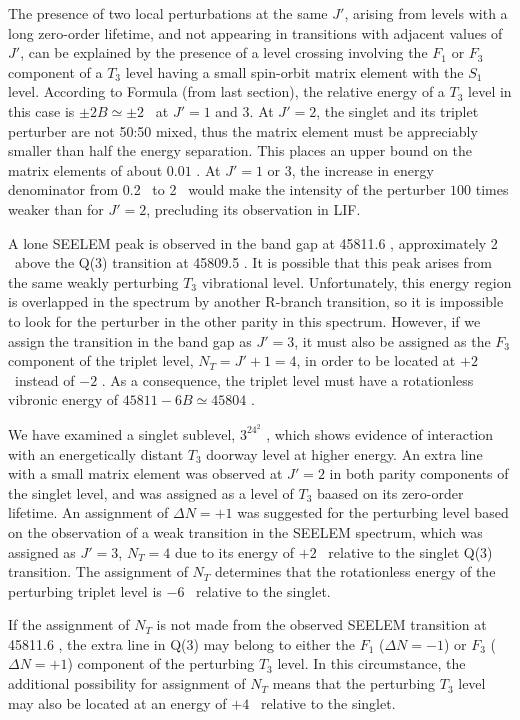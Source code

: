 \documentclass[12pt]{mitthesis}
\begin{document}
The presence of two local perturbations at the same $J'$, arising from
levels with a long zero-order lifetime, and not appearing in
transitions with adjacent values of $J'$, can be explained by the
presence of a level crossing involving the $F_1$ or $F_3$ component of
a $T_3$ level having a small spin-orbit matrix element with the $S_1$
level.  According to Formula (from last section), the relative energy
of a $T_3$ level in this case is $\pm 2B \simeq \pm 2$ \rcm\ at $J'=1$
and $3$.  At $J'=2$, the singlet and its triplet perturber are not
50:50 mixed, thus the matrix element must be appreciably smaller than
half the energy separation.  This places an upper bound on the matrix
elements of about $0.01$ \rcm.  At $J'=1$ or $3$, the increase in
energy denominator from 0.2 \rcm\ to 2 \rcm\ would make the intensity
of the perturber $100$ times weaker than for $J'=2$, precluding its
observation in LIF.

A lone SEELEM peak is observed in the band gap at 45811.6 \rcm,
approximately 2 \rcm\ above the Q(3) transition at 45809.5 \rcm.  It
is possible that this peak arises from the same weakly perturbing
$T_3$ vibrational level.  Unfortunately, this energy region is
overlapped in the spectrum by another R-branch transition, so it is
impossible to look for the perturber in the other parity in this
spectrum.  However, if we assign the transition in the band gap as
$J'=3$, it must also be assigned as the $F_3$ component of the triplet
level, $N_T=J'+1=4$, in order to be located at $+2$ \rcm\ instead of
$-2$ \rcm.  As a consequence, the triplet level must have a
rotationless vibronic energy of $45811 - 6B \simeq 45804$ \rcm.

We have examined a singlet sublevel, $3^24^2$ , which shows
evidence of interaction with an energetically distant $T_3$ doorway
level at higher energy.  An extra line with a small matrix element was
observed at $J'=2$ in both parity components of the singlet level, and
was assigned as a level of $T_3$ baased on its zero-order lifetime.
An assignment of $\Delta N=+1$ was suggested for the perturbing level
based on the observation of a weak transition in the SEELEM spectrum,
which was assigned as $J'=3$, $N_T=4$ due to its energy of $+2$ \rcm\
relative to the singlet Q(3) transition.  The assignment of $N_T$
determines that the rotationless energy of the perturbing triplet
level is $-6$ \rcm\ relative to the singlet. 

If the assignment of $N_T$ is not made from the observed SEELEM
transition at 45811.6 \rcm, the extra line in Q(3) may belong to
either the $F_1$ ($\Delta N = -1$) or $F_3$ ($\Delta N = +1$)
component of the perturbing $T_3$ level.  In this circumstance, the
additional possibility for assignment of $N_T$ means that the
perturbing $T_3$ level may also be located at an energy of $+4$ \rcm\
relative to the singlet.
\end{document}
